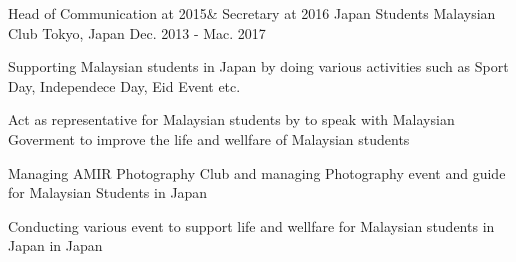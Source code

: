 

\begin{cventries}

  \cventry
    {Head of Communication  at 2015\& Secretary at 2016} %
    {Japan Students Malaysian Club} %
    {Tokyo, Japan} %
    {Dec. 2013 - Mac. 2017} %
    {
      \begin{cvitems} %
        \item {Supporting Malaysian students in Japan by doing various activities such as Sport Day, Independece Day, Eid Event etc.}
        \item {Act as representative for Malaysian students by to speak with Malaysian Goverment to improve the life and wellfare of Malaysian students
        \item {Managing AMIR Photography Club and managing Photography event and guide for Malaysian Students in Japan}
        \item {Conducting various event to support life and wellfare for Malaysian students in Japan}
			in Japan}
      \end{cvitems}
    }

%
\end{cventries}
